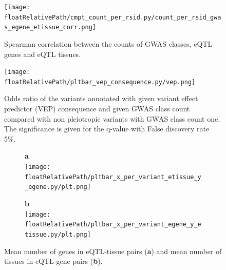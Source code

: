 %
\begin{figure}[!tbp]
    \centering
%
    \texttt{[image: \\floatRelativePath/cmpt\_count\_per\_rsid.py/count\_per\_rsid\_gwas\_egene\_etissue\_corr.png]}
%
    \caption{Spearman correlation between the counts of GWAS classes, eQTL genes and eQTL tissues.}
    \label{fig:correlation_counts}
%
\end{figure}

%
%

\begin{figure}[!tbp]
    \centering
%
    \texttt{[image: \\floatRelativePath/pltbar\_vep\_consequence.py/vep.png]}
%
    \caption{Odds ratio of the variants annotated with given variant effect
    predictor (VEP) consequence and given GWAS class count compared with non
    pleiotropic variants with GWAS class count one. The significance is given for the
    q-value with False discovery rate 5\%.}
    \label{fig:vep_consequence}
%
\end{figure}

%
\begin{figure}[!tbp]
    \centering
%
    \begin{subfigure}[]{.32\textwidth}
        \textbf{a}
        \\
        \texttt{[image: \\floatRelativePath/pltbar\_x\_per\_variant\_etissue\_y\_egene.py/plt.png]}
    \end{subfigure}
%
    \begin{subfigure}[]{.32\textwidth}
        \textbf{b}
        \\
        \texttt{[image: \\floatRelativePath/pltbar\_x\_per\_variant\_egene\_y\_etissue.py/plt.png]}
    \end{subfigure}
%
%
    \caption{Mean number of genes in eQTL-tissue pairs (\textbf{a}) and mean number of tissues in eQTL-gene pairs (\textbf{b}).} \label{fig:gwas_egene_etisue_per_variant}
%
\end{figure}

